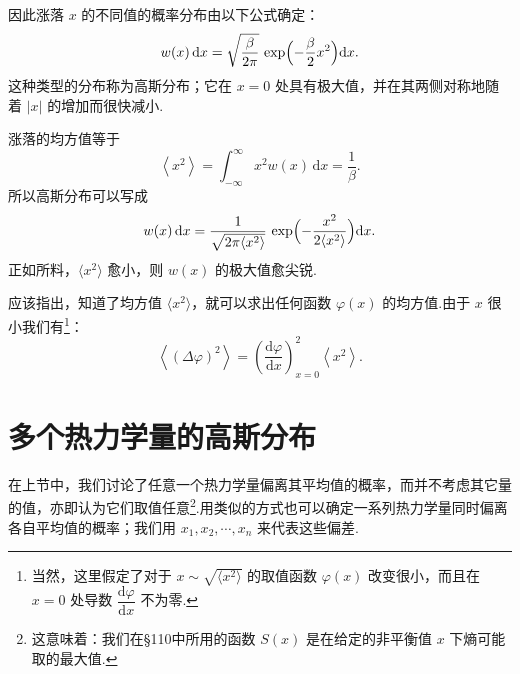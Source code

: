 因此涨落 $x$ 的不同值的概率分布由以下公式确定：
\begin{equation}
  w(x)\,\mathrm{d}x=\sqrt{\frac{\beta}{2\pi}}\,
  \exp\Bigl(-\frac{\beta}{2}x^{2}\Bigr)\mathrm{d}x.
\end{equation}
这种类型的分布称为高斯分布；它在 $x=0$ 处具有极大值，并在其两侧对称地随着 $|x|$ 的增加而很快减小.

涨落的均方值等于
\begin{equation}
  \left\langle x^{2}\right\rangle
  =\int_{-\infty}^{\infty}x^{2}w(x)\,\mathrm{d}x=\frac{1}{\beta}.
\end{equation}
所以高斯分布可以写成
\begin{equation}
  w(x)\,\mathrm{d}x=\frac{1}{\sqrt{2\pi\langle x^{2}\rangle}}\,
  \exp\Bigl(-\frac{x^{2}}{2\langle x^{2}\rangle}\Bigr)\mathrm{d}x.
\end{equation}
正如所料，$\langle x^{2}\rangle$ 愈小，则 $w(x)$ 的极大值愈尖锐.

应该指出，知道了均方值 $\langle x^{2}\rangle$，就可以求出任何函数 $\varphi(x)$ 的均方值.由于 $x$ 很小我们有\footnote{当然，这里假定了对于 $x\sim\sqrt{\langle x^{2}\rangle}$ 的取值函数 $\varphi(x)$ 改变很小，而且在 $x=0$ 处导数 $\dfrac{\mathrm{d}\varphi}{\mathrm{d}x}$ 不为零.}：
\begin{equation}
  \left\langle(\Delta\varphi)^{2}\right\rangle
  =\left(\frac{\mathrm{d}\varphi}{\mathrm{d}x}\right)^{2}_{x=0}
  \left\langle x^{2}\right\rangle.
\end{equation}

\section{多个热力学量的高斯分布}

在上节中，我们讨论了任意一个热力学量偏离其平均值的概率，而并不考虑其它量的值，亦即认为它们取值任意\footnote{这意味着：我们在§110中所用的函数 $S(x)$ 是在给定的非平衡值 $x$ 下熵可能取的最大值.}.用类似的方式也可以确定一系列热力学量同时偏离各自平均值的概率；我们用 $x_{1},x_{2},\cdots,x_{n}$ 来代表这些偏差.

